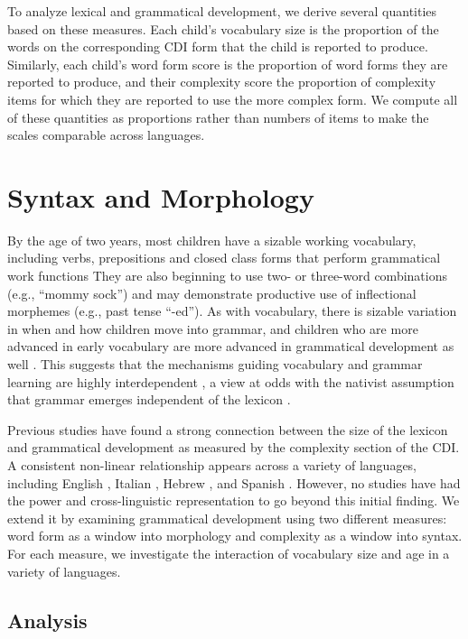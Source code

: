 \documentclass[10pt,letterpaper]{article}
\begin{document}
To analyze lexical and grammatical development, we derive several quantities based on these measures. Each child's vocabulary size is the proportion of the words on the corresponding CDI form that the child is reported to produce. Similarly, each child's word form score is the proportion of word forms they are reported to produce, and their complexity score the proportion of complexity items for which they are reported to use the more complex form. We compute all of these quantities as proportions rather than numbers of items to make the scales comparable across languages.

\section{Syntax and Morphology}

By the age of two years, most children have a sizable working vocabulary, including verbs, prepositions and closed class forms that perform grammatical work functions  They are also beginning to use two- or three-word combinations (e.g., ``mommy sock'') and may demonstrate productive use of inflectional morphemes (e.g., past tense ``-ed''). As with vocabulary, there is sizable variation in when and how children move into grammar, and children who are more advanced in early vocabulary are more advanced in grammatical development as well \cite{bates1999}. This suggests that the mechanisms guiding vocabulary and grammar learning are highly interdependent \cite{tomasello2003,bresnan2001}, a view at odds with the nativist assumption that grammar emerges independent of the lexicon \cite{chomsky1981}.

Previous studies have found a strong connection between the size of the lexicon and grammatical development as measured by the complexity section of the CDI. A consistent non-linear relationship appears across a variety of languages, including English \cite{bates1994,fenson1994}, Italian \cite{caselli1999}, Hebrew \cite{maital2000}, and Spanish \cite{jackson-maldonado2003}. However, no studies have had the power and cross-linguistic representation to go beyond this initial finding. We extend it by examining grammatical development using two different measures: word form as a window into morphology and complexity as a window into syntax. For each measure, we investigate the interaction of vocabulary size and age in a variety of languages.

\subsection{Analysis}
\end{document}
